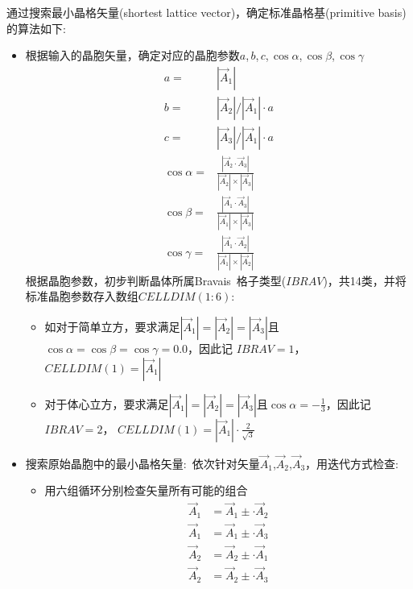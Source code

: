 \documentclass{article}      %
\begin{document}
通过搜索最小晶格矢量(\textrm{shortest lattice vector})，确定标准晶格基(\textrm{primitive basis})的算法如下:~
\begin{itemize}
	\item 根据输入的晶胞矢量，确定对应的晶胞参数$a$,\,$b$,\,$c$,\,$\cos\alpha$,\,$\cos\beta$,\,$\cos\gamma$
		\begin{displaymath}
			\begin{aligned}
			a=&|\vec A_1|\\
			b=&|\vec A_2|/|\vec A_1|\cdot a\\
			c=&|\vec A_3|/|\vec A_1|\cdot a\\
			\cos\alpha=&\frac{|\vec A_2\cdot\vec A_3|}{|\vec A_2|\times|\vec A_3|}\\
			\cos\beta=&\frac{|\vec A_1\cdot\vec A_3|}{|\vec A_1|\times|\vec A_3|}\\
			\cos\gamma=&\frac{|\vec A_1\cdot\vec A_2|}{|\vec A_1|\times|\vec A_2|}
			\end{aligned}
			\label{eq:Cell_DM}
		\end{displaymath}
根据晶胞参数，初步判断晶体所属\textrm{Bravais~}格子类型($\mathit{IBRAV}$)，共14类，并将标准晶胞参数存入数组$\mathit{CELLDIM}(1:6)$:~
\begin{itemize}
	\item 如对于简单立方，要求满足$|\vec A_1|=|\vec A_2|=|\vec A_3|$且$\cos\alpha=\cos\beta=\cos\gamma=0.0$，因此记
				$\mathit{IBRAV}=1$，
				$\mathit{CELLDIM}(1)=|\vec A_1|$
	\item 对于体心立方，要求满足$|\vec A_1|=|\vec A_2|=|\vec A_3|$且$\cos\alpha=-\frac13$，因此记
				$\mathit{IBRAV}=2$，
				$\mathit{CELLDIM}(1)=|\vec A_1|\cdot\frac2{\sqrt3}$
\end{itemize}
	\item 搜索原始晶胞中的最小晶格矢量:~依次针对矢量$\vec A_1$,$\vec A_2$,$\vec A_3$，用迭代方式检查:~
		\begin{itemize}
			\item 用六组循环分别检查矢量所有可能的组合
				\begin{displaymath}
					\begin{aligned}
						\vec A_1&=\vec A_1\pm\cdot\vec A_2\\
						\vec A_1&=\vec A_1\pm\cdot\vec A_3\\
						\vec A_2&=\vec A_2\pm\cdot\vec A_1\\
						\vec A_2&=\vec A_2\pm\cdot\vec A_3\\

\end{aligned}
\end{displaymath}
\end{itemize}
\end{itemize}
\end{document}
